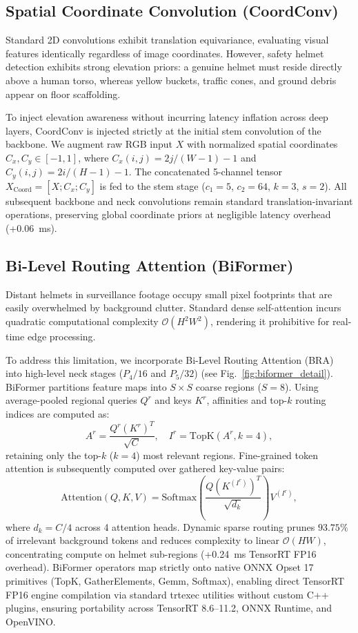 \documentclass[conference]{IEEEtran}
\begin{document}
\subsection{Spatial Coordinate Convolution (CoordConv)}
\label{subsec:coordconv}
Standard 2D convolutions exhibit translation equivariance, evaluating visual features identically regardless of image coordinates. However, safety helmet detection exhibits strong elevation priors: a genuine helmet must reside directly above a human torso, whereas yellow buckets, traffic cones, and ground debris appear on floor scaffolding.

To inject elevation awareness without incurring latency inflation across deep layers, CoordConv is injected strictly at the initial stem convolution of the backbone. We augment raw RGB input $X$ with normalized spatial coordinates $C_x, C_y \in [-1, 1]$, where $C_x(i, j) = 2j/(W - 1) - 1$ and $C_y(i, j) = 2i/(H - 1) - 1$. The concatenated 5-channel tensor \mbox{$X_{\text{Coord}} = [X; C_x; C_y]$} is fed to the stem stage ($c_1{=}5$, $c_2{=}64$, $k{=}3$, $s{=}2$). All subsequent backbone and neck convolutions remain standard translation-invariant operations, preserving global coordinate priors at negligible latency overhead (+0.06~ms).

\subsection{Bi-Level Routing Attention (BiFormer)}
\label{subsec:biformer}
Distant helmets in surveillance footage occupy small pixel footprints that are easily overwhelmed by background clutter. Standard dense self-attention incurs quadratic computational complexity $\mathcal{O}(H^2 W^2)$, rendering it prohibitive for real-time edge processing.

To address this limitation, we incorporate Bi-Level Routing Attention (BRA)~\cite{zhu2023biformer} into high-level neck stages ($P_4/16$ and $P_5/32$) (see Fig.~\ref{fig:biformer_detail}). BiFormer partitions feature maps into $S \times S$ coarse regions ($S=8$). Using average-pooled regional queries $Q^r$ and keys $K^r$, affinities and top-$k$ routing indices are computed as:
\begin{equation}
A^r = \frac{Q^r (K^r)^T}{\sqrt{C}}, \quad I^r = \text{TopK}(A^r, k=4),
\end{equation}
retaining only the top-$k$ ($k=4$) most relevant regions. Fine-grained token attention is subsequently computed over gathered key-value pairs:
\begin{equation}
\text{Attention}(Q, K, V) = \text{Softmax}\left(\frac{Q (K^{(I^r)})^T}{\sqrt{d_k}}\right) V^{(I^r)},
\end{equation}
where $d_k = C / 4$ across 4 attention heads. Dynamic sparse routing prunes $93.75\%$ of irrelevant background tokens and reduces complexity to linear $\mathcal{O}(HW)$, concentrating compute on helmet sub-regions (+0.24~ms TensorRT FP16 overhead). BiFormer operators map strictly onto native ONNX Opset 17 primitives (TopK, GatherElements, Gemm, Softmax), enabling direct TensorRT FP16 engine compilation via standard trtexec utilities without custom C++ plugins, ensuring portability across TensorRT 8.6--11.2, ONNX Runtime, and OpenVINO.
\end{document}
